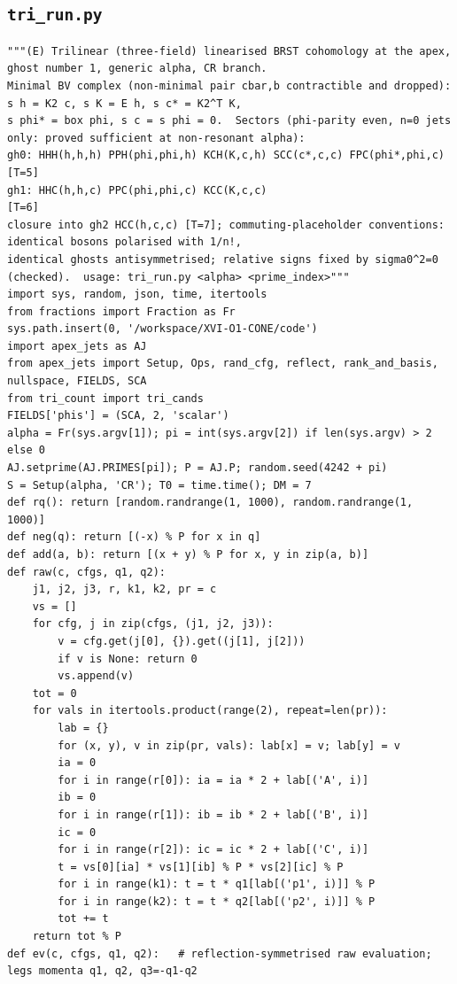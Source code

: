 \documentclass[10pt]{article}
\begin{document}
\subsection{\texttt{tri\_run.py}}
\begin{lstlisting}
"""(E) Trilinear (three-field) linearised BRST cohomology at the apex, ghost number 1, generic alpha, CR branch.
Minimal BV complex (non-minimal pair cbar,b contractible and dropped): s h = K2 c, s K = E h, s c* = K2^T K,
s phi* = box phi, s c = s phi = 0.  Sectors (phi-parity even, n=0 jets only: proved sufficient at non-resonant alpha):
gh0: HHH(h,h,h) PPH(phi,phi,h) KCH(K,c,h) SCC(c*,c,c) FPC(phi*,phi,c)  [T=5]
gh1: HHC(h,h,c) PPC(phi,phi,c) KCC(K,c,c)                               [T=6]
closure into gh2 HCC(h,c,c) [T=7]; commuting-placeholder conventions: identical bosons polarised with 1/n!,
identical ghosts antisymmetrised; relative signs fixed by sigma0^2=0 (checked).  usage: tri_run.py <alpha> <prime_index>"""
import sys, random, json, time, itertools
from fractions import Fraction as Fr
sys.path.insert(0, '/workspace/XVI-O1-CONE/code')
import apex_jets as AJ
from apex_jets import Setup, Ops, rand_cfg, reflect, rank_and_basis, nullspace, FIELDS, SCA
from tri_count import tri_cands
FIELDS['phis'] = (SCA, 2, 'scalar')
alpha = Fr(sys.argv[1]); pi = int(sys.argv[2]) if len(sys.argv) > 2 else 0
AJ.setprime(AJ.PRIMES[pi]); P = AJ.P; random.seed(4242 + pi)
S = Setup(alpha, 'CR'); T0 = time.time(); DM = 7
def rq(): return [random.randrange(1, 1000), random.randrange(1, 1000)]
def neg(q): return [(-x) % P for x in q]
def add(a, b): return [(x + y) % P for x, y in zip(a, b)]
def raw(c, cfgs, q1, q2):
    j1, j2, j3, r, k1, k2, pr = c
    vs = []
    for cfg, j in zip(cfgs, (j1, j2, j3)):
        v = cfg.get(j[0], {}).get((j[1], j[2]))
        if v is None: return 0
        vs.append(v)
    tot = 0
    for vals in itertools.product(range(2), repeat=len(pr)):
        lab = {}
        for (x, y), v in zip(pr, vals): lab[x] = v; lab[y] = v
        ia = 0
        for i in range(r[0]): ia = ia * 2 + lab[('A', i)]
        ib = 0
        for i in range(r[1]): ib = ib * 2 + lab[('B', i)]
        ic = 0
        for i in range(r[2]): ic = ic * 2 + lab[('C', i)]
        t = vs[0][ia] * vs[1][ib] % P * vs[2][ic] % P
        for i in range(k1): t = t * q1[lab[('p1', i)]] % P
        for i in range(k2): t = t * q2[lab[('p2', i)]] % P
        tot += t
    return tot % P
def ev(c, cfgs, q1, q2):   # reflection-symmetrised raw evaluation; legs momenta q1, q2, q3=-q1-q2

\end{lstlisting}
\end{document}
